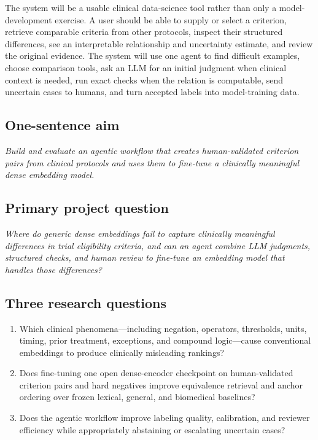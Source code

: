 \documentclass[11pt]{article}
\begin{document}
The system will be a usable clinical data-science tool rather than only a model-development exercise. A user should be able to supply or select a criterion, retrieve comparable criteria from other protocols, inspect their structured differences, see an interpretable relationship and uncertainty estimate, and review the original evidence. The system will use one agent to find difficult examples, choose comparison tools, ask an LLM for an initial judgment when clinical context is needed, run exact checks when the relation is computable, send uncertain cases to humans, and turn accepted labels into model-training data.

\subsection*{One-sentence aim}

\emph{Build and evaluate an agentic workflow that creates human-validated criterion pairs from clinical protocols and uses them to fine-tune a clinically meaningful dense embedding model.}

\subsection*{Primary project question}

\emph{Where do generic dense embeddings fail to capture clinically meaningful differences in trial eligibility criteria, and can an agent combine LLM judgments, structured checks, and human review to fine-tune an embedding model that handles those differences?}

\subsection*{Three research questions}

\begin{enumerate}
    \item Which clinical phenomena---including negation, operators, thresholds, units, timing, prior treatment, exceptions, and compound logic---cause conventional embeddings to produce clinically misleading rankings?
    \item Does fine-tuning one open dense-encoder checkpoint on human-validated criterion pairs and hard negatives improve equivalence retrieval and anchor ordering over frozen lexical, general, and biomedical baselines?
    \item Does the agentic workflow improve labeling quality, calibration, and reviewer efficiency while appropriately abstaining or escalating uncertain cases?
\end{enumerate}
\end{document}
